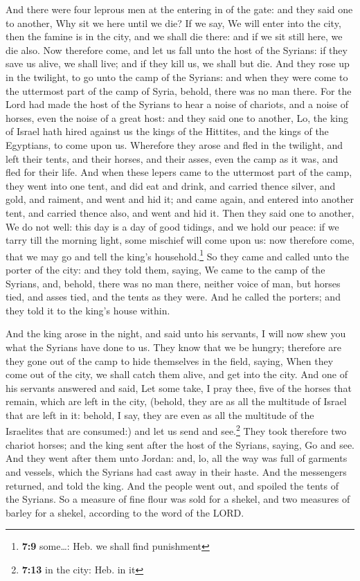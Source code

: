  And there were four leprous men at the entering in of the
gate: and they said one to another, Why sit we here until we die?
 If we say, We will enter into the city, then the famine
is in the city, and we shall die there: and if we sit still here, we die
also. Now therefore come, and let us fall unto the host of the Syrians:
if they save us alive, we shall live; and if they kill us, we shall but
die.  And they rose up in the twilight, to go unto the
camp of the Syrians: and when they were come to the uttermost part of
the camp of Syria, behold, there was no man there.  For
the Lord had made the host of the Syrians to hear a noise of chariots,
and a noise of horses, even the noise of a great host: and they said one
to another, Lo, the king of Israel hath hired against us the kings of
the Hittites, and the kings of the Egyptians, to come upon us.
 Wherefore they arose and fled in the twilight, and left
their tents, and their horses, and their asses, even the camp as it was,
and fled for their life.  And when these lepers came to
the uttermost part of the camp, they went into one tent, and did eat and
drink, and carried thence silver, and gold, and raiment, and went and
hid it; and came again, and entered into another tent, and carried
thence also, and went and hid it.  Then they said one to
another, We do not well: this day is a day of good tidings, and we hold
our peace: if we tarry till the morning light, some mischief will come
upon us: now therefore come, that we may go and tell the king's
household.\footnote{\textbf{7:9} some\ldots: Heb. we shall find
  punishment}  So they came and called unto the porter of
the city: and they told them, saying, We came to the camp of the
Syrians, and, behold, there was no man there, neither voice of man, but
horses tied, and asses tied, and the tents as they were. 
And he called the porters; and they told it to the king's house within.

 And the king arose in the night, and said unto his
servants, I will now shew you what the Syrians have done to us. They
know that we be hungry; therefore are they gone out of the camp to hide
themselves in the field, saying, When they come out of the city, we
shall catch them alive, and get into the city.  And one
of his servants answered and said, Let some take, I pray thee, five of
the horses that remain, which are left in the city, (behold, they are as
all the multitude of Israel that are left in it: behold, I say, they are
even as all the multitude of the Israelites that are consumed:) and let
us send and see.\footnote{\textbf{7:13} in the city: Heb. in it}
 They took therefore two chariot horses; and the king
sent after the host of the Syrians, saying, Go and see. 
And they went after them unto Jordan: and, lo, all the way was full of
garments and vessels, which the Syrians had cast away in their haste.
And the messengers returned, and told the king.  And the
people went out, and spoiled the tents of the Syrians. So a measure of
fine flour was sold for a shekel, and two measures of barley for a
shekel, according to the word of the LORD.

